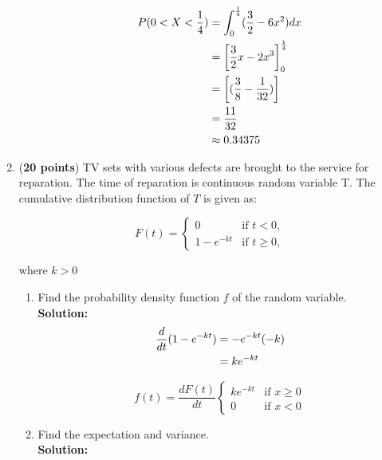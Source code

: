 \documentclass[a4paper]{article}
\begin{document}
\begin{enumerate}
\begin{enumerate}
\begin{align}
	P(0 < X < \frac{1}{4}) &= \int_0^\frac{1}{4} (\frac{3}{2} - 6x^2)dx\notag\\
	&= \left[ \frac{3}{2}x - 2x^3 \right]_0^\frac{1}{4}\notag\\
	&= \left[ (\frac{3}{8} - \frac{1}{32})\right]\notag\\
	&= \frac{11}{32}\notag\\
	&\approx 0.34375\notag
\end{align}	
	
	
	
	
\end{enumerate}







\item (\textbf{20 points}) TV sets with various defects are brought to the service for reparation. The time of reparation is continuous random variable T. The cumulative distribution function of $T$ is given as:


\[
 F(t) = 
  \begin{cases} 
   0 & \text{if } t < 0,\\
   1 - e^{-kt} & \text{if } t \geq 0,
  \end{cases}
\]
\begin{center}
where $k > 0$
\end{center}

\newpage

\begin{enumerate}
	\item Find the probability density function $f$ of the random variable.\\
	\textbf{Solution:}\\


\begin{align}
	\frac{d}{dt} (1 - e^{-kt}) &= -e^{-kt}(-k)\notag\\
	&= ke^{-kt}\notag
\end{align}



\[
 f(t) = \frac{dF(t)}{dt}
  \begin{cases} 
    ke^{-kt} & \text{if } x \geq 0\\
   0 & \text{if } x < 0
  \end{cases}
\]
\vspace{1em}


	\item Find the expectation and variance.\\
	\textbf{Solution:}\\
			

\end{enumerate}
\end{enumerate}
\end{document}
